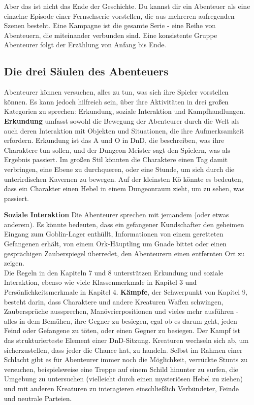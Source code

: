 Aber das ist nicht das Ende der Geschichte. Du kannst dir ein Abenteuer als eine einzelne Episode einer Fernsehserie vorstellen, die aus mehreren aufregenden Szenen besteht. Eine Kampagne ist die gesamte Serie - eine Reihe von Abenteuern, die miteinander verbunden sind. Eine konsistente Gruppe Abenteurer folgt der Erzählung von Anfang bis Ende.

\subsection{Die drei Säulen des Abenteuers}
Abenteurer können versuchen, alles zu tun, was sich ihre Spieler vorstellen können. Es kann jedoch hilfreich sein, über ihre Aktivitäten in drei großen Kategorien zu sprechen: Erkundung, soziale Interaktion und Kampfhandlungen.\\
\textbf{Erkundung} umfasst sowohl die Bewegung der Abenteurer durch die Welt als auch deren Interaktion mit Objekten und Situationen, die ihre Aufmerksamkeit erfordern. Erkundung ist das A und O in DnD, die beschreiben, was ihre Charaktere tun sollen, und der Dungeon-Meister sagt den Spielern, was als Ergebnis passiert. Im großen Stil könnten die Charaktere einen Tag damit verbringen, eine Ebene zu durchqueren, oder eine Stunde, um sich durch die unterirdischen Kavernen zu bewegen. Auf der kleinsten Kö könnte es bedeuten, dass ein Charakter einen Hebel in einem Dungeonraum zieht, um zu sehen, was passiert.


\textbf{Soziale Interaktion}
Die Abenteurer sprechen mit jemandem (oder etwas anderem). Es könnte bedeuten, dass ein gefangener Kundschafter den geheimen Eingang zum Goblin-Lager enthüllt, Informationen von einem geretteten Gefangenen erhält, von einem Ork-Häuptling um Gnade bittet oder einen gesprächigen Zauberspiegel überredet, den Abenteurern einen entfernten Ort zu zeigen.\\
Die Regeln in den Kapiteln 7 und 8 unterstützen Erkundung und soziale Interaktion, ebenso wie viele Klassenmerkmale in Kapitel 3 und Persönlichkeitsmerkmale in Kapitel 4.
\textbf{Kämpfe}, der Schwerpunkt von Kapitel 9, besteht darin, dass Charaktere und andere Kreaturen Waffen schwingen, Zaubersprüche aussprechen, Manövrierpositionen und vieles mehr ausführen - alles in dem Bemühen, ihre Gegner zu besiegen, egal ob es darum geht, jeden Feind oder Gefangene zu töten, oder einen Gegner zu besiegen. Der Kampf ist das strukturierteste Element einer DnD-Sitzung. Kreaturen wechseln sich ab, um sicherzustellen, dass jeder die Chance hat, zu handeln. Selbst im Rahmen einer Schlacht gibt es für Abenteurer immer noch die Möglichkeit, verrückte Stunts zu versuchen, beispielsweise eine Treppe auf einem Schild hinunter zu surfen, die Umgebung zu untersuchen (vielleicht durch einen mysteriösen Hebel zu ziehen) und mit anderen Kreaturen zu interagieren einschließlich Verbündeter, Feinde und neutrale Parteien.
